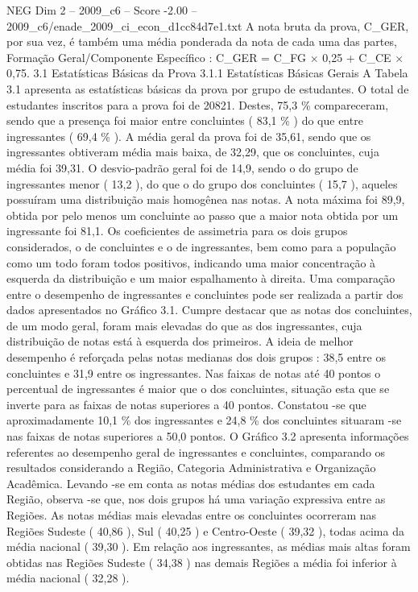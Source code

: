 \begin{textsample}{NEG Dim 2 – 2009\_c6 – Score -2.00 – 2009\_c6/enade\_2009\_ci\_econ\_d1cc84d7e1.txt}
A nota bruta da prova, C\_GER, por sua vez, é também uma média ponderada da nota de cada uma das partes, Formação Geral/Componente Específico : C\_GER = C\_FG × 0,25 + C\_CE × 0,75. 3.1 Estatísticas Básicas da Prova 3.1.1 Estatísticas Básicas Gerais A Tabela 3.1 apresenta as estatísticas básicas da prova por grupo de estudantes.
O total de estudantes inscritos para a prova foi de 20821.
Destes, 75,3 \% compareceram, sendo que a presença foi maior entre concluintes ( 83,1 \% ) do que entre ingressantes ( 69,4 \% ).
A média geral da prova foi de 35,61, sendo que os ingressantes obtiveram média mais baixa, de 32,29, que os concluintes, cuja média foi 39,31.
O desvio-padrão geral foi de 14,9, sendo o do grupo de ingressantes menor ( 13,2 ), do que o do grupo dos concluintes ( 15,7 ), aqueles possuíram uma distribuição mais homogênea nas notas.
A nota máxima foi 89,9, obtida por pelo menos um concluinte ao passo que a maior nota obtida por um ingressante foi 81,1.
Os coeficientes de assimetria para os dois grupos considerados, o de concluintes e o de ingressantes, bem como para a população como um todo foram todos positivos, indicando uma maior concentração à esquerda da distribuição e um maior espalhamento à direita.
Uma comparação entre o desempenho de ingressantes e concluintes pode ser realizada a partir dos dados apresentados no Gráfico 3.1.
Cumpre destacar que as notas dos concluintes, de um modo geral, foram mais elevadas do que as dos ingressantes, cuja distribuição de notas está à esquerda dos primeiros.
A ideia de melhor desempenho é reforçada pelas notas medianas dos dois grupos : 38,5 entre os concluintes e 31,9 entre os ingressantes.
Nas faixas de notas até 40 pontos o percentual de ingressantes é maior que o dos concluintes, situação esta que se inverte para as faixas de notas superiores a 40 pontos.
Constatou -se que aproximadamente 10,1 \% dos ingressantes e 24,8 \% dos concluintes situaram -se nas faixas de notas superiores a 50,0 pontos.
O Gráfico 3.2 apresenta informações referentes ao desempenho geral de ingressantes e concluintes, comparando os resultados considerando a Região, Categoria Administrativa e Organização Acadêmica.
Levando -se em conta as notas médias dos estudantes em cada Região, observa -se que, nos dois grupos há uma variação expressiva entre as Regiões.
As notas médias mais elevadas entre os concluintes ocorreram nas Regiões Sudeste ( 40,86 ), Sul ( 40,25 ) e Centro-Oeste ( 39,32 ), todas acima da média nacional ( 39,30 ).
Em relação aos ingressantes, as médias mais altas foram obtidas nas Regiões Sudeste ( 34,38 ) nas demais Regiões a média foi inferior à média nacional ( 32,28 ).

\end{textsample}
